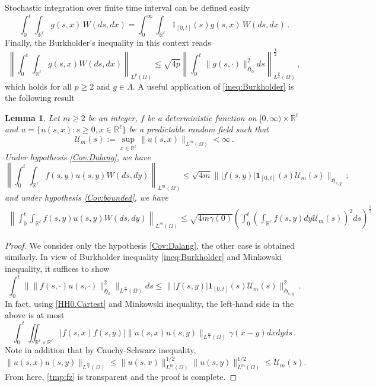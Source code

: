 \documentclass[12pt,reqno]{amsart}
\newtheorem{lemma}[theorem]{Lemma}
\theoremstyle{remark}
\newcommand{\1}{\mathbf{1}}
\def\RR{\mathbb{R}}
\def\HH{\mathfrak{H}}
\def\U{\mathcal{U}}
\def\lt{\left}
\def\rt{\right}
\def\HH{\mathfrak{H}}
\begin{document}
		Stochastic integration over finite time interval can be defined easily
		\begin{equation*}
		 	 \int_0^t\int_{\mathbb{R}^\ell}g(s,x) \, W(ds,dx)= \int_0^\infty\int_{\mathbb{R}^\ell}1_{[0,t]}(s) g(s,x) \, W(ds,dx)\,.
		\end{equation*} 
		Finally, the Burkholder's inequality in this context reads
		\begin{equation} \label{ineq:Burkholder}
			\lt\|\int_0^t\int_{\RR^\ell}g(s,x)W(ds,dx)\rt\|_{L^p(\Omega)}\le \sqrt{4 p}\lt\|\int_0^t\|g(s,\cdot)\|^2_{\HH_0}ds \rt\|^{\frac12}_{L^{\frac p2}(\Omega)}\,,
		\end{equation}
		which holds for all $p\ge2$ and $g\in \Lambda$. A useful application of \eqref{ineq:Burkholder} is the following result
		\begin{lemma}\label{lem:Wm}
		 Let $m\ge2$  be an integer, $f$ be a deterministic function on $[0,\infty)\times\RR^\ell$ and $u=\{u(s,x): s\ge0,x\in\RR^\ell\}$ be a predictable random field such that
		\begin{equation*}
			\U_m(s):=\sup_{x\in\RR^\ell}\|u(s,x)\|_{L^m(\Omega)}<\infty\,.
		\end{equation*}
		Under hypothesis \ref{Cov:Dalang}, we have
		\begin{equation*}
			\lt\|\int_0^t\int_{\RR^\ell}f(s,y)u(s,y)W(ds,dy) \rt\|_{L^m(\Omega)}
			\le \sqrt{4m}  \||f(s,y)| \mathbf{1}_{[0,t]}(s)\U_m(s)\|_{\HH_{s,y}}\,;
		\end{equation*}
		and under hypothesis \ref{Cov:bounded}, we have
		\begin{align*}
			\left\| \int_0^t \int_{\RR^{\ell}} f(s,y)u(s,y) W(ds,dy)\right\|_{L^m(\Omega)} \leq \sqrt{4m \gamma	(0)} 
			 \left( \int_0^t \left(\int_{\RR^{\ell}} f(s,y) dy \U_m(s)\right)^2 ds \right)^{\frac12}
		\end{align*}
	\end{lemma}
	\begin{proof}
		We consider only the hypothesis \ref{Cov:Dalang}, the other case is obtained similarly. In view of Burkholder inequality \eqref{ineq:Burkholder} and Minkowski inequality, it suffices to show
		\begin{equation}\label{tmp:fz}
			\int_0^t\| \|f(s,\cdot)u(s,\cdot)\|^2_{\HH_0}\|_{L^{\frac m2}(\Omega)} ds\le \||f(s,y)| \mathbf{1}_{[0,t]}(s)\U_m(s)\|_{\HH_{s,y}}^2\,.
		\end{equation}
		In fact, using \eqref{HH0.Cartest} and Minkowski inequality, the left-hand side in the above is at most
		\begin{equation*}
			\int_0^t\iint_{\RR^\ell\times \RR^\ell}|f(s,x)f(s,y)| \|u(s,x)u(s,y)\|_{L^{\frac m2}(\Omega)}\gamma(x-y)dxdyds\,.
		\end{equation*}
		Note in addition that by Cauchy-Schwarz inequality,
		\[ \|u(s,x)u(s,y)\|_{L^{\frac m2}(\Omega)}\le \|u(s,x)\|_{L^m(\Omega)}^{1/2}\|u(s,y)\|_{L^m(\Omega)}^{1/2}\le\U_m(s). \]
		From here, \eqref{tmp:fz} is transparent and the proof is complete.
	\end{proof}
\end{document}

